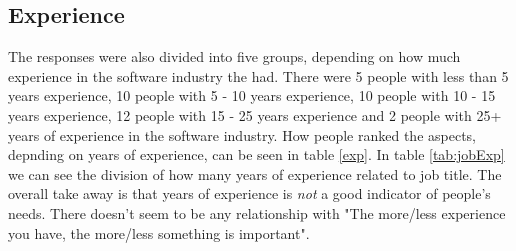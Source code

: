 \documentclass{cslthse-msc}
\begin{document}
    \subsection{Experience}
    The responses were also divided into five groups, depending on how much
    experience in the software industry the had. There were 5 people with
    less than 5 years experience, 10 people with 5 - 10 years experience, 10
    people with 10 - 15 years experience, 12 people with 15 - 25 years
    experience and 2 people with 25+ years of experience in the software
    industry. How people ranked the aspects, depnding on years of experience, can be seen in table \ref{exp}. In table \ref{tab:jobExp} we can see the division of how many years of experience related to job title.
    The overall take away is that years of experience is \textit{not} a good indicator of people's needs. There doesn't seem to be any relationship with "The more/less experience you have, the more/less something is important".
\end{document}
